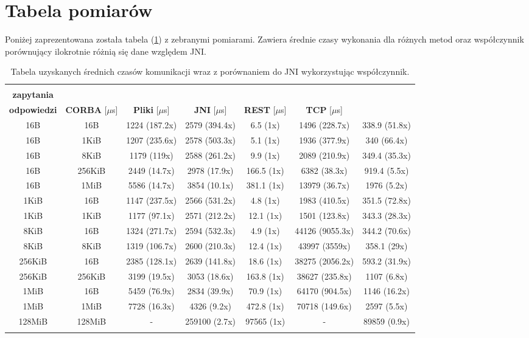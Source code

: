 \section{Tabela pomiarów}

Poniżej zaprezentowana została tabela (\ref{tab:all_results}) z zebranymi pomiarami. Zawiera średnie czasy wykonania dla różnych metod oraz współczynnik porównujący ilokrotnie różnią się dane względem JNI.

\begin{longtable}{|c|c|c|c|c|c|c|}
    \hline
    \begin{tabular}{@{}c@{}} \textbf{Rozmiar} \\ \textbf{zapytania} \end{tabular} & \begin{tabular}{@{}c@{}} \textbf{Rozmiar} \\ \textbf{odpowiedzi} \end{tabular} & \textbf{CORBA} [$\mu$s] & \textbf{Pliki} [$\mu$s] & \textbf{JNI} [$\mu$s] & \textbf{REST} [$\mu$s] & \textbf{TCP} [$\mu$s] \\
    \hline
    16B & 16B & 1224 (187.2x) & 2579 (394.4x) & 6.5 (1x) & 1496 (228.7x) & 338.9 (51.8x) \\
    16B & 1KiB & 1207 (235.6x) & 2578 (503.3x) & 5.1 (1x) & 1936 (377.9x) & 340 (66.4x) \\
    16B & 8KiB & 1179 (119x) & 2588 (261.2x) & 9.9 (1x) & 2089 (210.9x) & 349.4 (35.3x) \\
    16B & 256KiB & 2449 (14.7x) & 2978 (17.9x) & 166.5 (1x) & 6382 (38.3x) & 919.4 (5.5x) \\
    16B & 1MiB & 5586 (14.7x) & 3854 (10.1x) & 381.1 (1x) & 13979 (36.7x) & 1976 (5.2x) \\
    1KiB & 16B & 1147 (237.5x) & 2566 (531.2x) & 4.8 (1x) & 1983 (410.5x) & 351.5 (72.8x) \\
    1KiB & 1KiB & 1177 (97.1x) & 2571 (212.2x) & 12.1 (1x) & 1501 (123.8x) & 343.3 (28.3x) \\
    8KiB & 16B & 1324 (271.7x) & 2594 (532.3x) & 4.9 (1x) & 44126 (9055.3x) & 344.2 (70.6x) \\
    8KiB & 8KiB & 1319 (106.7x) & 2600 (210.3x) & 12.4 (1x) & 43997 (3559x) & 358.1 (29x) \\
    256KiB & 16B & 2385 (128.1x) & 2639 (141.8x) & 18.6 (1x) & 38275 (2056.2x) & 593.2 (31.9x) \\
    256KiB & 256KiB & 3199 (19.5x) & 3053 (18.6x) & 163.8 (1x) & 38627 (235.8x) & 1107 (6.8x) \\
    1MiB & 16B & 5459 (76.9x) & 2834 (39.9x) & 70.9 (1x) & 64170 (904.5x) & 1146 (16.2x) \\
    1MiB & 1MiB & 7728 (16.3x) & 4326 (9.2x) & 472.8 (1x) & 70718 (149.6x) & 2597 (5.5x) \\
    128MiB & 128MiB & - & 259100 (2.7x) & 97565 (1x) & - & 89859 (0.9x) \\
    \hline
    \caption{Tabela uzyskanych średnich czasów komunikacji wraz z porównaniem do JNI wykorzystując współczynnik.}
    \label{tab:all_results}
\end{longtable}


